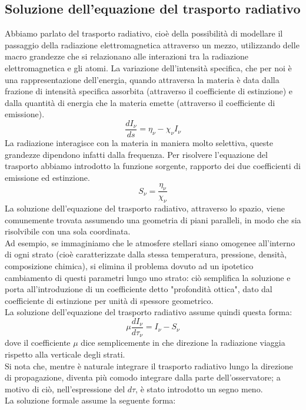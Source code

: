 \documentclass[a4paper,11pt]{article}
\begin{document}
    \subsection{Soluzione dell'equazione del trasporto radiativo}
    Abbiamo parlato del trasporto radiativo, cioè della possibilità di modellare il passaggio della radiazione elettromagnetica attraverso un mezzo, utilizzando delle macro grandezze che si relazionano alle interazioni tra la radiazione elettromagnetica e gli atomi. La variazione dell'intensità specifica, che per noi è una rappresentazione dell'energia, quando attraversa la materia è data dalla frazione di intensità specifica assorbita (attraverso il coefficiente di estinzione) e dalla quantità di energia che la materia emette (attraverso il coefficiente di emissione).
     $$
       \frac{ dI_{\nu}} {ds} = \eta_{\nu} - \chi_{\nu} I_{\nu}
     $$
    La radiazione interagisce con la materia in maniera molto selettiva, queste grandezze dipendono infatti dalla frequenza.
    Per risolvere l'equazione del trasporto abbiamo introdotto la funzione sorgente, rapporto dei due coefficienti di emissione ed estinzione.
    $$
      S_{\nu} = \frac{\eta_{\nu}} {\chi_{\nu}}
    $$
    La soluzione dell'equazione del trasporto radiativo, attraverso lo spazio, viene comunemente trovata assumendo una geometria di piani paralleli, in modo che sia risolvibile con una sola coordinata.\\
    Ad esempio, se immaginiamo che le atmosfere stellari siano omogenee all'interno di ogni strato  (cioè caratterizzate dalla stessa temperatura, pressione, densità, composizione chimica), si elimina il problema dovuto ad un ipotetico cambiamento di questi parametri lungo uno strato: ciò semplifica la soluzione e porta all'introduzione di un coefficiente detto "profondità ottica", dato dal coefficiente di estinzione per unità di spessore geometrico.\\
    La soluzione dell'equazione del trasporto radiativo assume quindi questa forma:
    $$
    \mu \frac{dI_{\nu}}{d{\tau_{\nu}}} = I_{\nu}- S_{\nu}
    $$
    dove il coefficiente $\mu$ dice semplicemente in che direzione la radiazione viaggia rispetto alla verticale degli strati.\\
    Si nota che, mentre è naturale integrare il trasporto radiativo lungo la direzione di propagazione, diventa più comodo integrare dalla parte dell'osservatore; a motivo di ciò, nell'espressione del $d{\tau}$, è stato introdotto un segno meno.\\
    La soluzione formale assume la seguente forma:
\end{document}
